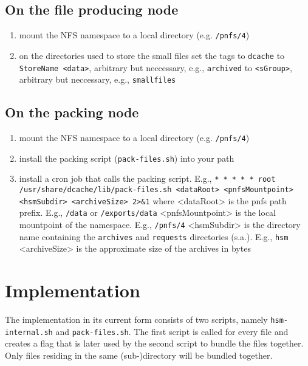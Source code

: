 \documentclass[a4paper,8pt]{scrartcl}
\begin{document}
\subsection{On the file producing node}
\begin{enumerate}
  \item mount the NFS namespace to a local directory (e.g. \texttt{/pnfs/4})
  \item on the directories used to store the small files set the tags
     to \texttt{dcache}
     to \texttt{StoreName <data>}, arbitrary but neccessary, e.g., \texttt{archived}
     to \texttt{<sGroup>}, arbitrary but neccessary, e.g., \texttt{smallfiles}
\end{enumerate}

\subsection{On the packing node}
\begin{enumerate}
  \item mount the NFS namespace to a local directory (e.g. \texttt{/pnfs/4})
  \item install the packing script (\texttt{pack-files.sh}) into your path
  \item install a cron job that calls the packing script. E.g., 
    \subitem \texttt{*  *  *  *  * root /usr/share/dcache/lib/pack-files.sh <dataRoot> <pnfsMountpoint> <hsmSubdir> <archiveSize> 2>\&1}
    \subitem where <dataRoot> is the pnfs path prefix. E.g., \texttt{/data} or \texttt{/exports/data}
    \subitem <pnfsMountpoint> is the local mountpoint of the namespace. E.g., \texttt{/pnfs/4}
    \subitem <hsmSubdir> is the directory name containing the \texttt{archives} and \texttt{requests} directories (s.a.). E.g., \texttt{hsm}
    \subitem <archiveSize> is the approximate size of the archives in bytes
\end{enumerate}

\section{Implementation} 
The implementation in its current form consists of two scripts, namely
\texttt{hsm-internal.sh} and \texttt{pack-files.sh}. The first script is called
for every file and creates a flag that is later used by the second script to
bundle the files together. Only files residing in the same (sub-)directory will 
be bundled together.
\end{document}
